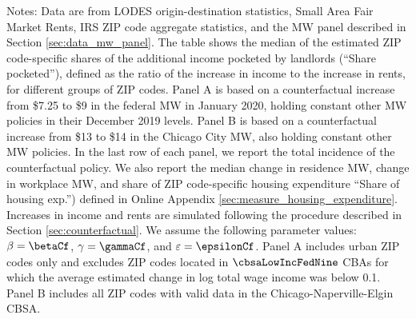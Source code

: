 \begin{table}[hbt!]
    \begin{minipage}{.95\textwidth} \footnotesize
        \vspace{3.5mm}
        Notes: 
        Data are from LODES origin-destination statistics, 
        Small Area Fair Market Rents, 
        IRS ZIP code aggregate statistics, and 
        the MW panel described in Section \ref{sec:data_mw_panel}.
        The table shows the median of the estimated ZIP code-specific shares of 
        the additional income pocketed by landlords (``Share pocketed''), 
        defined as the ratio of the increase in income to the increase in rents,
        for different groups of ZIP codes.
        Panel A is based on a counterfactual increase from \$7.25 to \$9 in the 
        federal MW in January 2020, holding constant other MW policies in their 
        December 2019 levels.
        Panel B is based on a counterfactual increase from \$13 to \$14 in the 
        Chicago City MW, also holding constant other MW policies.
        In the last row of each panel, we report the total incidence of the 
        counterfactual policy.
        We also report the median change in residence MW, change in workplace MW,
        and share of ZIP code-specific housing expenditure ``Share of housing 
        exp.'') defined in Online Appendix \ref{sec:measure_housing_expenditure}.
        Increases in income and rents are simulated following the procedure 
        described in Section \ref{sec:counterfactual}.
        We assume the following parameter values: 
        $\beta = \betaCf$, $\gamma = \gammaCf$, and $\varepsilon = \epsilonCf$.
        Panel A includes urban ZIP codes only and excludes ZIP codes located 
        in $\cbsaLowIncFedNine$ CBAs for which the average estimated change in 
        log total wage income was below 0.1.
        Panel B includes all ZIP codes with valid data in the 
        Chicago-Naperville-Elgin CBSA.
    \end{minipage}
\end{table}



